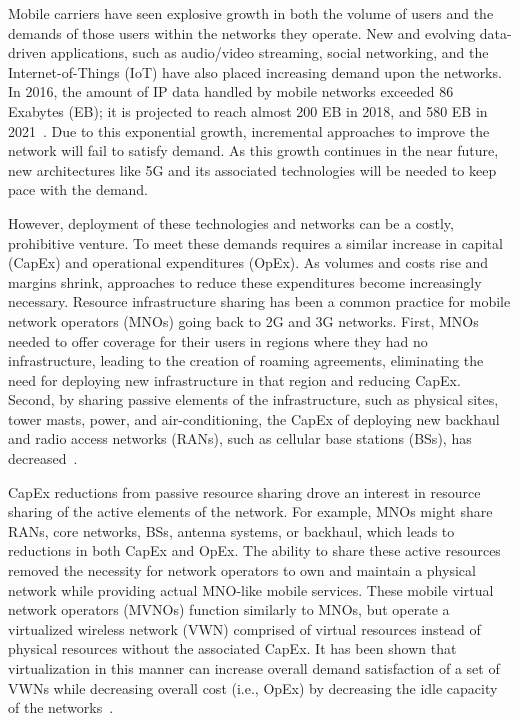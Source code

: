 \documentclass[12pt,dvipsnames]{report}
\begin{document}
Mobile carriers have seen explosive growth in both the volume of users and the demands of those users within the networks they operate.  New and evolving data-driven applications, such as audio/video streaming, social networking, and the Internet-of-Things (IoT) have also placed increasing demand upon the networks.  In 2016, the amount of IP data handled by mobile networks exceeded 86 Exabytes (EB); it is projected to reach almost 200 EB in 2018, and 580 EB in 2021~\cite{ciscoVNI2017}.  Due to this exponential growth, incremental approaches to improve the network will fail to satisfy demand.  As this growth continues in the near future, new architectures like 5G and its associated technologies will be needed to keep pace with the demand.

However, deployment of these technologies and networks can be a costly, prohibitive venture.  To meet these demands requires a similar increase in capital (CapEx) and operational expenditures (OpEx).  As volumes and costs rise and margins shrink, approaches to reduce these expenditures become increasingly necessary.  Resource infrastructure sharing has been a common practice for mobile network operators (MNOs) going back to 2G and 3G networks.  First, MNOs needed to offer coverage for their users in regions where they had no infrastructure, leading to the creation of roaming agreements, eliminating the need for deploying new infrastructure in that region and reducing CapEx.  Second, by sharing passive elements of the infrastructure, such as physical sites, tower masts, power, and air-conditioning, the CapEx of deploying new backhaul and radio access networks (RANs), such as cellular base stations (BSs), has decreased~\cite{1421931}.

CapEx reductions from passive resource sharing drove an interest in resource sharing of the active elements of the network.  For example, MNOs might share RANs, core networks, BSs, antenna systems, or backhaul, which leads to reductions in both CapEx and OpEx.  The ability to share these active resources removed the necessity for network operators to own and maintain a physical network while providing actual MNO-like mobile services.  These mobile virtual network operators (MVNOs) function similarly to MNOs, but operate a virtualized wireless network (VWN) comprised of virtual resources instead of physical resources without the associated CapEx.  It has been shown that virtualization in this manner can increase overall demand satisfaction of a set of VWNs while decreasing overall cost (i.e., OpEx) by decreasing the idle capacity of the networks~\cite{MJ_CCNC_16}.
\end{document}

